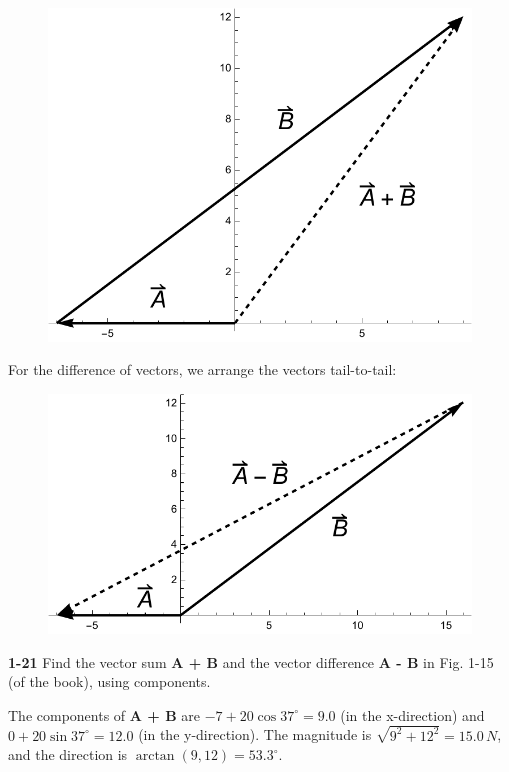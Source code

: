 \documentclass{amsart}
\begin{document}
\begin{figure}[h]
\includegraphics[scale=0.32]{1-20a}
\end{figure}

For the difference of vectors, we arrange the vectors tail-to-tail:

\begin{figure}[h]
\includegraphics[scale=0.32]{1-20b}
\end{figure}

\textbf{1-21} Find the vector sum \textbf{A + B} and the vector difference \textbf{A - B} in Fig. 1-15 (of the book), using components.

The components of \textbf{A + B} are $-7 + 20 \cos 37^\circ = 9.0$ (in the x-direction) and $0 + 20 \sin 37^\circ = 12.0$ (in the y-direction).
The magnitude is $\sqrt{9^2 + 12^2} = 15.0\,N$, and the direction is $\arctan(9,12) = 53.3^\circ$.
\end{document}
